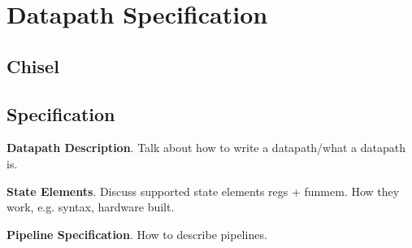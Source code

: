 \section{Datapath Specification}

\subsection{Chisel}

\subsection{Specification}

{\bf Datapath Description}. Talk about how to write a datapath/what a
datapath is.

{\bf State Elements}. Discuss supported state elements regs +
funmem. How they work, e.g. syntax, hardware built.

{\bf Pipeline Specification}. How to describe pipelines.
